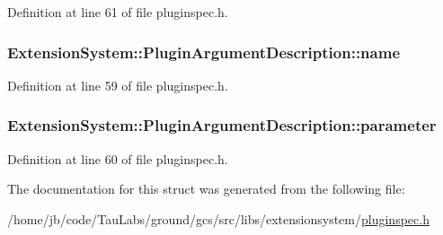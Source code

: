 \-Definition at line 61 of file pluginspec.\-h.

\hypertarget{struct_extension_system_1_1_plugin_argument_description_a495886e47df85811638066b4263f27a1}{
\subsubsection[{name}]{ {\bf \-Extension\-System\-::\-Plugin\-Argument\-Description\-::name}}}\label{struct_extension_system_1_1_plugin_argument_description_a495886e47df85811638066b4263f27a1}


\-Definition at line 59 of file pluginspec.\-h.

\hypertarget{struct_extension_system_1_1_plugin_argument_description_a451dd714bb63d9c2125491f142939b01}{
\subsubsection[{parameter}]{ {\bf \-Extension\-System\-::\-Plugin\-Argument\-Description\-::parameter}}}\label{struct_extension_system_1_1_plugin_argument_description_a451dd714bb63d9c2125491f142939b01}


\-Definition at line 60 of file pluginspec.\-h.



\-The documentation for this struct was generated from the following file\-:\begin{DoxyCompactItemize}
\item 
/home/jb/code/\-Tau\-Labs/ground/gcs/src/libs/extensionsystem/\hyperlink{pluginspec_8h}{pluginspec.\-h}\end{DoxyCompactItemize}
